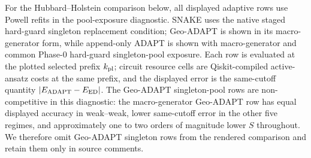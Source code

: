 \documentclass[
  reprint,
  amsmath,
  amssymb,
  aps,
  pra,
  nofootinbib,
  superscriptaddress,
  floatfix
]{revtex4-2}
\begin{document}
For the Hubbard--Holstein comparison below, all displayed adaptive rows use Powell refits in the pool-exposure diagnostic. SNAKE uses the native staged hard-guard singleton replacement condition; Geo-ADAPT is shown in its macro-generator form, while append-only ADAPT is shown with macro-generator and common Phase-0 hard-guard singleton-pool exposure. Each row is evaluated at the plotted selected prefix \(k_{\rm pl}\); circuit resource cells are Qiskit-compiled active-ansatz costs at the same prefix, and the displayed error is the same-cutoff quantity \(|E_{\rm ADAPT}-E_{\rm ED}|\). The Geo-ADAPT singleton-pool rows are non-competitive in this diagnostic: the macro-generator Geo-ADAPT row has equal displayed accuracy in weak--weak, lower same-cutoff error in the other five regimes, and approximately one to two orders of magnitude lower \(S\) throughout. We therefore omit Geo-ADAPT singleton rows from the rendered comparison and retain them only in source comments.
\end{document}
